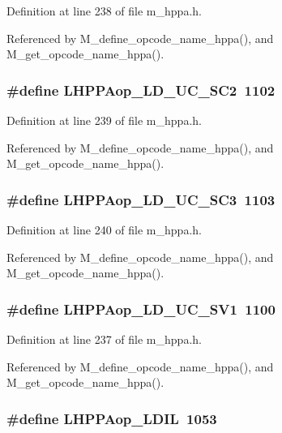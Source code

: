 Definition at line 238 of file m\_\-hppa.h.

Referenced by M\_\-define\_\-opcode\_\-name\_\-hppa(), and M\_\-get\_\-opcode\_\-name\_\-hppa().
\subsubsection{\setlength{\rightskip}{0pt plus 5cm}\#define LHPPAop\_\-LD\_\-UC\_\-SC2~1102}\label{m__hppa_8h_0f2deb7f972d39cc7026402c62fd7e5e}




Definition at line 239 of file m\_\-hppa.h.

Referenced by M\_\-define\_\-opcode\_\-name\_\-hppa(), and M\_\-get\_\-opcode\_\-name\_\-hppa().
\subsubsection{\setlength{\rightskip}{0pt plus 5cm}\#define LHPPAop\_\-LD\_\-UC\_\-SC3~1103}\label{m__hppa_8h_0230b6baa46cbbfd50e40d113ee0f2a6}




Definition at line 240 of file m\_\-hppa.h.

Referenced by M\_\-define\_\-opcode\_\-name\_\-hppa(), and M\_\-get\_\-opcode\_\-name\_\-hppa().
\subsubsection{\setlength{\rightskip}{0pt plus 5cm}\#define LHPPAop\_\-LD\_\-UC\_\-SV1~1100}\label{m__hppa_8h_51baa4880829b2b8692cba51daa470e3}




Definition at line 237 of file m\_\-hppa.h.

Referenced by M\_\-define\_\-opcode\_\-name\_\-hppa(), and M\_\-get\_\-opcode\_\-name\_\-hppa().
\subsubsection{\setlength{\rightskip}{0pt plus 5cm}\#define LHPPAop\_\-LDIL~1053}\label{m__hppa_8h_9e701540a654bfd1573415109b4ead90}




